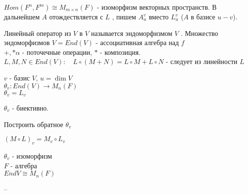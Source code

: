 \documentclass[12pt]{report}
\begin{document}
$Hom (F^n , F^m ) \cong M_{m\times n} (F)$ - изоморфизм векторных пространств.
В дальнейшем $A$ отождествляется с $L$ , пишем $A_u ^v $ вместо $L_u ^v$ ($A$ в базисе $u-v$). 
\begin{defn}
Линейный оператор  из $V $ в  $V$ называется эндоморфизмом $V$ .
Множество эндоморфизмов $V = End(V)$ - ассоциативная алгебра над $f$\\
$+, *\alpha$ - поточечные операции, $*$ - композиция.\\
$L, M, N \in End(V): \quad L\circ (M + N) = L \circ M + L \circ N$ - следует из линейности  $L$
\end{defn}
$v$  - базис $V$, $u = \dim V$ \\
$\theta _v : End(V) \to M_n (F)$ \\
$\theta _v = L_v$
\begin{st}
    $\theta_v$ -  биективно.
\end{st}
\begin{prac}
    Построить обратное $\theta_v$
\end{prac}

\begin{lm}
    $(M \circ L)_v = M_v \circ L_v$
\end{lm}
 \begin{st}
     $\theta _v$ - изоморфизм \\ $F$ - алгебра \\ $End V \cong M_n(F)$
\end{st}

--
\end{document}
